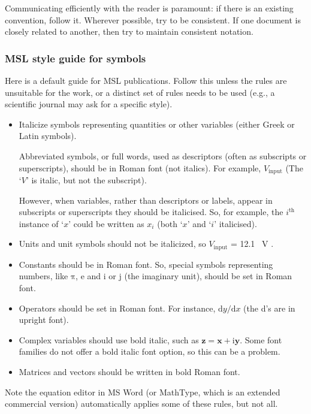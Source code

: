 Communicating efficiently with the reader is paramount: if there is an existing convention, follow it. Wherever possible, try to be consistent. If one document is closely related to another, then try to maintain consistent notation. 

\subsubsection{MSL style guide for symbols}
\label{sss:style_guide}
Here is a default guide for MSL publications. Follow this unless the rules are unsuitable for the work, or a distinct set of rules needs to be used (e.g., a scientific journal may ask for a specific style).

\begin{itemize}
\item Italicize symbols representing quantities or other variables (either Greek or Latin symbols). 

Abbreviated symbols, or full words, used as descriptors (often as subscripts or superscripts), should be in Roman font (not italics). For example, $V_\mathrm{input}$  (The `$V$' is italic, but not the subscript).

However, when variables, rather than descriptors or labels, appear in subscripts or superscripts they should be italicised. So, for example, the $i^\mathrm{th}$ instance of `$x$' could be written as $x_i$ (both `$x$' and `$i$' italicised).

\item Units and unit symbols should not be italicized, so $V_\mathrm{input}$ = \SI{12.1}{ V }.
	
\item Constants should be in Roman font. So, special symbols representing numbers, like $\mathrm{\pi}$, $\mathrm{e}$ and $\mathrm{i}$ or $\mathrm{j}$ (the imaginary unit), should be set in Roman font.
	
\item Operators should be set in Roman font. For instance, $\mathrm{d}y/\mathrm{d}x$ (the d's are in upright font).
	
\item Complex variables should use bold italic, such as $\bm{z}=\bm{x}+\mathrm{i} \bm{y}$. Some font families do not offer a bold italic font option, so this can be a problem.
	
\item Matrices and vectors should be written in bold Roman font.

\end{itemize}Note the equation editor in MS Word (or MathType, which is an extended commercial version) automatically applies some of these rules, but not all. 


